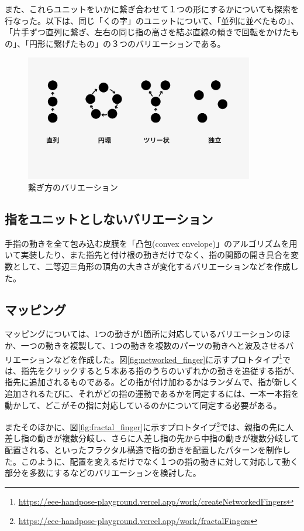 また、これらユニットをいかに繋ぎ合わせて１つの形にするかについても探索を行なった。以下は、同じ「くの字」のユニットについて、「並列に並べたもの」、「片手ずつ直列に繋ぎ、左右の同じ指の高さを結ぶ直線の傾きで回転をかけたもの」、「円形に繋げたもの」の３つのバリエーションである。

\begin{figure}[H]
  \centering
  \includegraphics[width=10cm]{img/network.png}
  \caption{繋ぎ方のバリエーション}
  \label{fig:connection_valiation}
\end{figure}



\subsection*{指をユニットとしないバリエーション}
手指の動きを全て包み込む皮膜を「凸包(convex envelope)」のアルゴリズムを用いて実装したり、また指先と付け根の動きだけでなく、指の関節の開き具合を変数として、二等辺三角形の頂角の大きさが変化するバリエーションなどを作成した。

\subsection{マッピング}
マッピングについては、1つの動きが1箇所に対応しているバリエーションのほか、一つの動きを複製して、1つの動きを複数のパーツの動きへと波及させるバリエーションなどを作成した。図\ref{fig:networked_finger}に示すプロトタイプ\footnote{\url{https://eee-handpose-playground.vercel.app/work/createNetworkedFingers}}では、指先をクリックすると５本ある指のうちのいずれかの動きを追従する指が、指先に追加されるものである。どの指が付け加わるかはランダムで、指が新しく追加されるたびに、それがどの指の運動であるかを同定するには、一本一本指を動かして、どこがその指に対応しているのかについて同定する必要がある。

またそのほかに、図\ref{fig:fractal_finger}に示すプロトタイプ\footnote{\url{https://eee-handpose-playground.vercel.app/work/fractalFingers}}では、親指の先に人差し指の動きが複数分岐し、さらに人差し指の先から中指の動きが複数分岐して配置される、といったフラクタル構造で指の動きを配置したパターンを制作した。このように、配置を変えるだけでなく１つの指の動きに対して対応して動く部分を多数にするなどのバリエーションを検討した。

